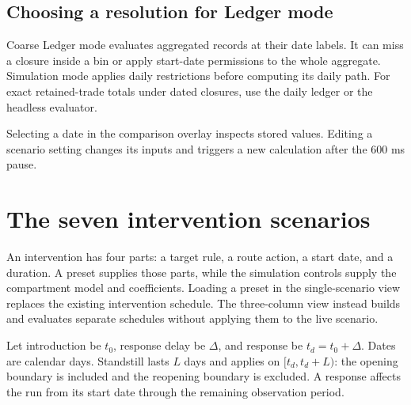 \documentclass[11pt,a4paper]{article}
\begin{document}
\subsection{Choosing a resolution for Ledger
mode}\label{choosing-a-resolution-for-ledger-mode}

Coarse Ledger mode evaluates aggregated records at their date labels. It
can miss a closure inside a bin or apply start-date permissions to the
whole aggregate. Simulation mode applies daily restrictions before
computing its daily path. For exact retained-trade totals under dated
closures, use the daily ledger or the headless evaluator.

Selecting a date in the comparison overlay inspects stored values.
Editing a scenario setting changes its inputs and triggers a new
calculation after the 600 ms pause.

\section{The seven intervention
scenarios}\label{the-seven-intervention-scenarios}

An intervention has four parts: a target rule, a route action, a start
date, and a duration. A preset supplies those parts, while the
simulation controls supply the compartment model and coefficients.
Loading a preset in the single-scenario view replaces the existing
intervention schedule. The three-column view instead builds and
evaluates separate schedules without applying them to the live scenario.

Let introduction be \(t_0\), response delay be \(\Delta \), and response
be \(t_d = t_0 + \Delta \). Dates are calendar days. Standstill lasts
\(L\) days and applies on \([t_d, t_d+L)\): the opening boundary is
included and the reopening boundary is excluded. A response affects the
run from its start date through the remaining observation period.
\end{document}
